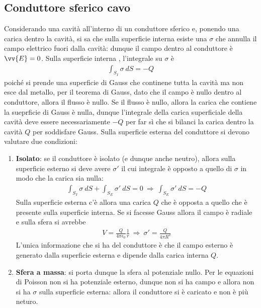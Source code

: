 \documentclass[a4paper, oneside]{article}
\begin{document}
\subsection{Conduttore sferico cavo}
Considerando una cavità all'interno di un conduttore sferico e, ponendo una carica dentro la cavità, 
si sa che sulla superficie interna esiste una $\sigma$ che annulla il campo elettrico fuori 
dalla cavità: dunque il campo dentro al conduttore è $\vv{E} = 0$. Sulla superficie interna ,
l'integrale su $\sigma$ è 
\begin{gather*}
    \int_{S_{I}}^{} \sigma \ dS = -Q
\end{gather*}
poiché si prende una superficie di Gauss che continene tutta la cavità 
ma non esce dal metallo, per il teorema di Gauss, dato che il campo è nullo dentro al conduttore,
allora il flusso è nullo. Se il flusso è nullo, allora la carica che contiene la sueprficie di Gauss è nulla, 
dunque l'integrale della carica superficiale della cavità deve essere necessariamente $-Q$ 
per far sì che si bilanci la carica dentro la cavità $Q$ per soddisfare Gauss.
Sulla superficie esterna del conduttore si devono valutare due condizioni:
\begin{enumerate}
    \item \textbf{Isolato}: se il conduttore è isolato (e dunque anche neutro), 
    allora sulla superficie esterno si deve avere $\sigma'$ il cui integrale è opposto 
    a quello di $\sigma$ in modo che la carica sia nulla:
    \begin{gather*}
        \int_{S_{I}}^{} \sigma \ dS + \int_{S_{E}}^{}  \sigma' \ dS = 0 \ \Longrightarrow \ \int_{S_{E}}^{} \sigma' \ dS = -Q
    \end{gather*}
    Sulla superficie esterna c'è allora una carica $Q$ che è opposta a quello che è presente 
    sulla superficie interna. Se si facesse Gauss allora il campo è radiale e sulla sfera
    si avrebbe 
    \begin{gather*}
        V = \frac{Q}{4\pi\epsilon_0} \frac{1}{r} \ \Longrightarrow \ \sigma' = \frac{Q}{4\pi R^{2}}
    \end{gather*}
    L'unica informazione che si ha del conduttore è che il campo esterno è generato dalla 
    superficie esterna e dipende dalla carica interna $Q$. 
    \item \textbf{Sfera a massa}: si porta dunque la sfera al potenziale nullo. Per le equazioni di Poisson 
    non si ha potenziale esterno, dunque non si ha campo e allora non si ha $\sigma$ sulla superficie esterna: allora 
    il conduttore si è caricato e non è più neturo. 
\end{enumerate}
\end{document}
